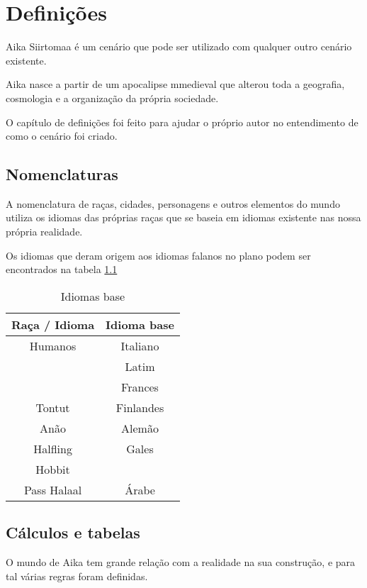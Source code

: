 \chapter{Defini\c{c}\~oes}
Aika Siirtomaa \'e um cen\'ario que pode ser utilizado com
qualquer outro cen\'ario existente.

Aika nasce a partir de um apocalipse mmedieval que alterou toda a
geografia, cosmologia e a organiza\c{c}\~ao da pr\'opria sociedade.

O cap\'itulo de defini\c{c}\~oes foi feito para ajudar o pr\'oprio
autor no entendimento de como o cen\'ario foi criado.

\section{Nomenclaturas}
A nomenclatura de ra\c{c}as, cidades, personagens e outros elementos
do mundo utiliza os idiomas das pr\'oprias ra\c{c}as que se
baseia em idiomas existente nas nossa pr\'opria realidade.

Os idiomas que deram origem aos idiomas falanos no plano
podem ser encontrados na tabela \ref{def:nomen:lang}

\begin{table}[hbt]
\begin{center}
\caption{Idiomas base}
\begin{tabular}{|c|c|}
\hline
\textbf{Ra\c{c}a / Idioma} & \textbf{Idioma base} \\
\hline
Humanos & Italiano \\
	& Latim \\
	& Frances \\
\hline
Tontut & Finlandes \\
\hline
An\~ao & Alem\~ao \\
\hline
Halfling & Gales \\
Hobbit & \\
\hline
Pass Halaal & \'Arabe \\
\hline
\end{tabular}
\label{def:nomen:lang}
\end{center}
\end{table}

\section{C\'alculos e tabelas}
O mundo de Aika tem grande rela\c{c}\~ao com a realidade
na sua constru\c{c}\~ao, e para tal v\'arias regras foram
definidas.


